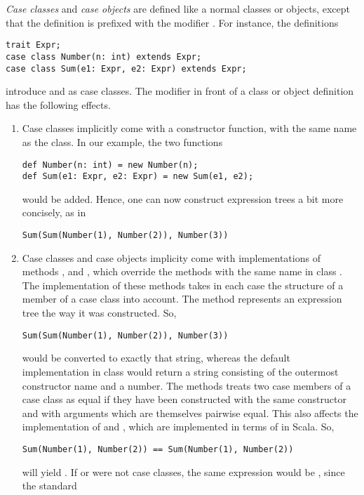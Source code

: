 {\em Case classes} and {\em case objects} are defined like a normal
classes or objects, except that the definition is prefixed with the modifier
.  For instance, the definitions
\begin{lstlisting}
trait Expr;
case class Number(n: int) extends Expr;
case class Sum(e1: Expr, e2: Expr) extends Expr;
\end{lstlisting}
introduce  and  as case classes.
The  modifier in front of a class or object 
definition has the following effects.
\begin{enumerate}
\item Case classes implicitly come with a constructor function, with the same name as the class. In our example, the two functions
\begin{lstlisting}
def Number(n: int) = new Number(n);
def Sum(e1: Expr, e2: Expr) = new Sum(e1, e2);
\end{lstlisting}
would be added. Hence, one can now construct expression trees a bit more concisely, as in
\begin{lstlisting}
Sum(Sum(Number(1), Number(2)), Number(3))
\end{lstlisting} 
\item Case classes and case objects 
implicity come with implementations of methods
,  and , which override the
methods with the same name in class . The implementation
of these methods takes in each case the structure of a member of a
case class into account. The  method represents an
expression tree the way it was constructed. So,
\begin{lstlisting}
Sum(Sum(Number(1), Number(2)), Number(3))
\end{lstlisting} 
would be converted to exactly that string, whereas the default
implementation in class  would return a string consisting
of the outermost constructor name  and a number.  The
 methods treats two case members of a case class as equal
if they have been constructed with the same constructor and with
arguments which are themselves pairwise equal. This also affects the
implementation of \code{==} and \code{!=}, which are implemented in
terms of  in Scala. So,
\begin{lstlisting}
Sum(Number(1), Number(2)) == Sum(Number(1), Number(2))
\end{lstlisting}
will yield . If  or  were not case
classes, the same expression would be , since the standard

\end{enumerate}
